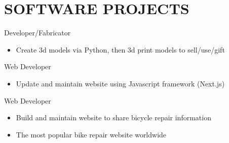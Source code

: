 
\section*{SOFTWARE PROJECTS}


\subtitle{3D Modelling via Python}{Developer/Fabricator}{}
\begin{itemize}
    \item Create 3d models via Python, then 3d print models to sell/use/gift
\end{itemize}   


\subtitle{206bikepolo.com}{Web Developer}{}

\begin{itemize}
    \item Update and maintain website using Javascript framework (Next.js)
    
\end{itemize}


\subtitle{SheldonBrown.com}{Web Developer}{}

\begin{itemize}
    \item Build and maintain website to share bicycle repair information
    \item The most popular bike repair website worldwide
    
\end{itemize}

